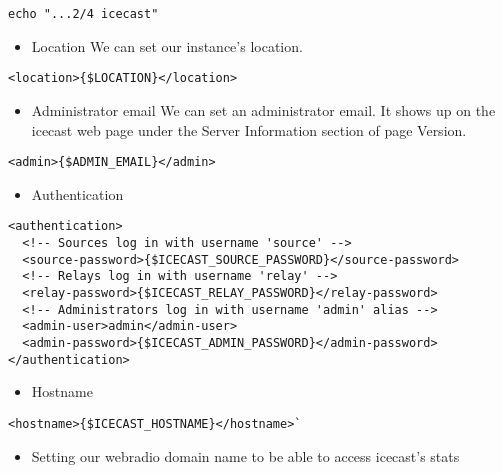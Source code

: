 \documentclass[12pt]{report}
\begin{document}
\begin{verbatim}
echo "...2/4 icecast"
\end{verbatim}

\begin{itemize}

\item
  Location We can set our instance's location.
\end{itemize}

\begin{verbatim}
<location>{$LOCATION}</location>
\end{verbatim}

\begin{itemize}

\item
  Administrator email We can set an administrator email. It shows up on
  the icecast web page under the Server Information section of page
  Version.
\end{itemize}

\begin{verbatim}
<admin>{$ADMIN_EMAIL}</admin>
\end{verbatim}

\begin{itemize}

\item
  Authentication
\end{itemize}

\begin{verbatim}
<authentication>
  <!-- Sources log in with username 'source' -->
  <source-password>{$ICECAST_SOURCE_PASSWORD}</source-password>
  <!-- Relays log in with username 'relay' -->
  <relay-password>{$ICECAST_RELAY_PASSWORD}</relay-password>
  <!-- Administrators log in with username 'admin' alias -->
  <admin-user>admin</admin-user>
  <admin-password>{$ICECAST_ADMIN_PASSWORD}</admin-password>
</authentication>
\end{verbatim}

\begin{itemize}

\item
  Hostname
\end{itemize}

\begin{verbatim}
<hostname>{$ICECAST_HOSTNAME}</hostname>`
\end{verbatim}

\begin{itemize}

\item
  Setting our webradio domain name to be able to access icecast's stats
\end{itemize}
\end{document}
